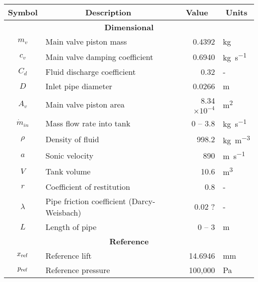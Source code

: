 \begin{table}[ht]
    \centering
    \begin{tabular}{c|l|r|l}
        \large \textbf{Symbol} &  \multicolumn{1}{c}{\large \textbf{Description}} & \multicolumn{1}{|c}{\large \textbf{Value}} & \multicolumn{1}{|c}{\large \textbf{Units}} \\ \hline \hline
        \multicolumn{4}{c}{\textbf{Dimensional}} \\ \hline
        $m_v$ & Main valve piston mass & 0.4392 & \si{kg} \\ \hline %
        $c_v$ & Main valve damping coefficient & 0.6940 & \si{kg.s^{-1}} \\ \hline %
        $C_d$ & Fluid discharge coefficient & 0.32 & - \\ \hline %
        $D$ & Inlet pipe diameter & 0.0266 & \si{m} \\ \hline %
        $A_v$ & Main valve piston area & 8.34 $\times 10^{-4}$ & \si{m^2} \\ \hline %
        $\dot{m}_{in}$ & Mass flow rate into tank & 0 -- 3.8 & \si{kg.s^{-1}} \\ \hline %
        $\rho$ & Density of fluid & 998.2 & \si{kg.m^{-3}} \\ \hline %
        $a$ & Sonic velocity & 890 & \si{m.s^{-1}} \\ \hline %
        $V$ & Tank volume & 10.6 & \si{m^3} \\ \hline %
        $r$ & Coefficient of restitution & 0.8 & - \\ \hline %
        $\lambda$ & Pipe friction coefficient (Darcy-Weisbach) & 0.02 ? & - \\ \hline %
        $L$ & Length of pipe & 0 -- 3 & \si{m} \\ \hline \hline %
        \multicolumn{4}{c}{\textbf{Reference}} \\ \hline
        $x_{\rm{ref}}$ & Reference lift & 14.6946 & \si{mm} \\ \hline %
        $p_{\rm{ref}}$ & Reference pressure & 100,000 & \si{Pa} \\ \hline

\end{tabular}
\end{table}
